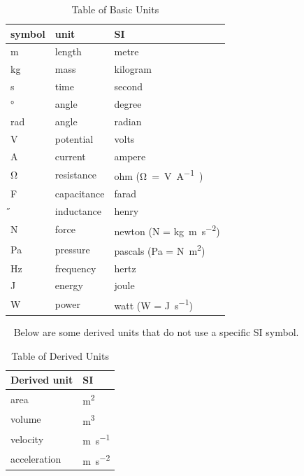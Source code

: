 \documentclass[12pt, titlepage]{article}
\begin{document}
\renewcommand{\arraystretch}{1.2}
	\begin{table}[H]
	  \noindent\begin{tabular}{l l l} 
	    \toprule		
	    \textbf{symbol} & \textbf{unit} & \textbf{SI}\\
	    \midrule 
	    \si{\metre} & length & metre\\
	    \si{\kilogram} & mass	& kilogram\\
	    \si{\second} & time & second\\
	    \si{\degree} & angle & degree\\
	    \si{\radian} & angle & radian\\
	    \si{\V} & potential & volts\\
	    \si{\ampere} & current & ampere\\
	    \si{\ohm} & resistance & ohm (\si\ohm = \si{\V\per\ampere})\\
	    \si{\F} & capacitance & farad\\
	    \si{\H} & inductance & henry\\
	    N & force & newton (N = \si{\kilogram\metre\per\square\second})\\
	    Pa & pressure & pascals (Pa = N\si{\per\square\metre})\\
	    \si{\Hz} & frequency & hertz\\
	    \si{\joule} & energy & joule\\
	    \si{\watt} & power & watt (W = \si{\joule\per\second})\\
	    \bottomrule
	  \end{tabular}
	\caption{\label{tabUnit}Table of Basic Units}
	\end{table}  
  ~\newline
Below are some derived units that do not use a specific SI symbol.
~\newline


  \renewcommand{\arraystretch}{1.2}
\begin{table}[H]
	 \noindent \begin{tabular}{l l} 
	    \toprule		
	    \textbf{Derived unit} & \textbf{SI}\\
	    \midrule 
	    area  & \si{\square\metre}\\
	    volume & \si{\cubic\metre}\\
	    velocity &  \si{\metre\per\second}\\
	    acceleration &  \si{\metre\per\square\second}\\    
	    \bottomrule
	  \end{tabular}
	\caption{\label{devUnit}Table of Derived Units}  
\end{table}
\end{document}
